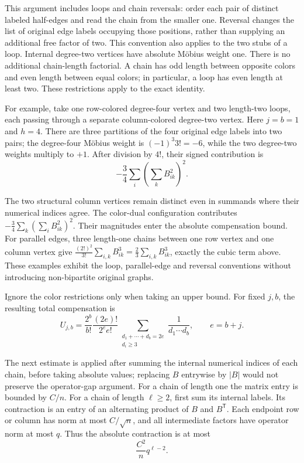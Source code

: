 \documentclass[11pt,a4paper]{article}
\begin{document}
This argument includes loops and chain reversals: order each pair of distinct labeled half-edges and read the chain from the smaller one. Reversal changes the list of original edge labels occupying those positions, rather than supplying an additional free factor of two. This convention also applies to the two stubs of a loop. Internal degree-two vertices have absolute Möbius weight one. There is no additional chain-length factorial. A chain has odd length between opposite colors and even length between equal colors; in particular, a loop has even length at least two. These restrictions apply to the exact identity.

For example, take one row-colored degree-four vertex and two length-two loops, each passing through a separate column-colored degree-two vertex. Here \(j=b=1\) and \(h=4\). There are three partitions of the four original edge labels into two pairs; the degree-four Möbius weight is \((-1)^3 3!=-6\), while the two degree-two weights multiply to \(+1\). After division by \(4!\), their signed contribution is
\[-\frac34\sum_i\left(\sum_k B_{ik}^2\right)^2.\]

The two structural column vertices remain distinct even in summands where their numerical indices agree. The color-dual configuration contributes \(-\tfrac34\sum_k(\sum_i B_{ik}^2)^2\). Their magnitudes enter the absolute compensation bound. For parallel edges, three length-one chains between one row vertex and one column vertex give \(\tfrac{(2!)^2}{3!}\sum_{i,k}B_{ik}^3=\tfrac23\sum_{i,k}B_{ik}^3\), exactly the cubic term above. These examples exhibit the loop, parallel-edge and reversal conventions without introducing non-bipartite original graphs.

Ignore the color restrictions only when taking an upper bound. For fixed \(j,b\), the resulting total compensation is
\[U_{j,b}=
\frac{2^b}{b!}\frac{(2e)!}{2^e e!}
\sum_{\substack{d_1+\cdots+d_b=2e\\d_i\ge3}}
\frac1{d_1\cdots d_b},
\qquad e=b+j.\]

The next estimate is applied after summing the internal numerical indices of each chain, before taking absolute values; replacing \(B\) entrywise by \(|B|\) would not preserve the operator-gap argument. For a chain of length one the matrix entry is bounded by \(C/n\). For a chain of length \(\ell\ge2\), first sum its internal labels. Its contraction is an entry of an alternating product of \(B\) and \(B^{\mathsf T}\). Each endpoint row or column has norm at most \(C/\sqrt n\), and all intermediate factors have operator norm at most \(q\). Thus the absolute contraction is at most
\[\frac{C^2}{n}q^{\ell-2}.\]
\end{document}

